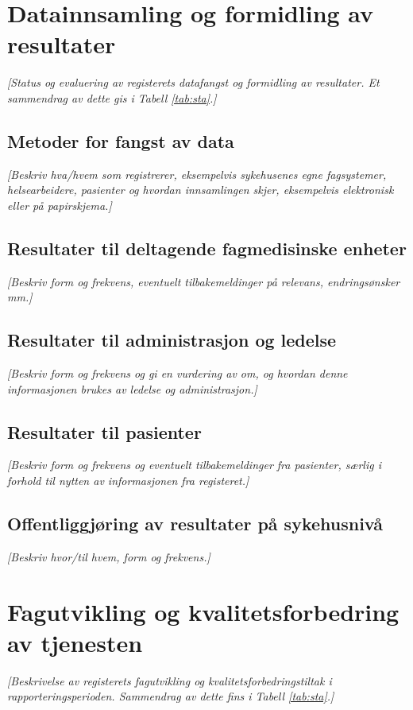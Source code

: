 \documentclass[norsk, a4paper, twocolumn]{report}
\newcommand{\guide}[1] {
	\textit{[\textcolor{guidegray}{#1}]}
	}
\begin{document}
\chapter{Datainnsamling og formidling av resultater}\label{cha:dat}
\guide{Status og evaluering av registerets  datafangst og formidling av 
resultater. Et sammendrag av dette gis i Tabell \ref{tab:sta}.}

\section{Metoder for fangst av data}\label{sec:metfan}
\guide{Beskriv hva/hvem som registrerer, eksempelvis sykehusenes egne
fagsystemer, helsearbeidere, pasienter og hvordan innsamlingen skjer,
eksempelvis elektronisk eller på papirskjema.}

\section{Resultater til deltagende fagmedisinske enheter}\label{sec:resfag}
\guide{Beskriv form og frekvens,  eventuelt tilbakemeldinger på relevans,
endringsønsker mm.}

\section{Resultater til administrasjon og ledelse}\label{sec:resled}
\guide{Beskriv form og frekvens og gi en vurdering av om, og hvordan denne
informasjonen brukes av ledelse og administrasjon.}

\section{Resultater til pasienter}\label{sec:respas}
\guide{Beskriv form og frekvens og eventuelt tilbakemeldinger fra pasienter,
særlig i forhold til nytten av informasjonen fra registeret.}

\section{Offentliggjøring av resultater på sykehusnivå}\label{sec:off}
\guide{Beskriv hvor/til hvem, form og frekvens.}




\chapter{Fagutvikling og kvalitetsforbedring av tjenesten}\label{cha:fag}
\guide{Beskrivelse av registerets fagutvikling og kvalitetsforbedringstiltak
i rapporteringsperioden. Sammendrag av dette fins i Tabell \ref{tab:sta}.}
\end{document}
